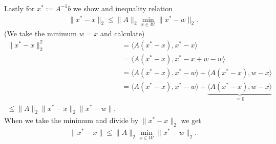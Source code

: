 \subsubsection{}
Lastly for $x^* := A^{-1}b$ we show and inequality relation
\begin{align}
    \|x^* - x\|_2 \le \|A\|_2 \min_{x \in \mathcal{W}}\|x^* -w\|_2.
\end{align}
(We take the minimum $w = x$ and calculate)
\begin{align}
    \|x^* - x\|_2^2
    &= \langle A(x^* -x), x^* - x\rangle\\
    &= \langle A(x^* -x), x^* - x +w -w\rangle\\
    &= \langle A(x^* -x), x^* - w\rangle + \langle A(x^* -x), w - x\rangle\\
    &= \langle A(x^* -x), x^* - w\rangle +\underbrace{\langle A(x^* -x), w -
    x\rangle}_{=0}\\
    \le \|A\|_2 \|x^* - x\|_2\|x^* - w\|.
\end{align}
When we take the minimum and divide by $\|x^* - x\|_2$ we get
\begin{align}
    \|x^* - x\| \le \|A\|_2\min_{x\in\mathcal{W}} \|x^* - w\|_2.
\end{align}


